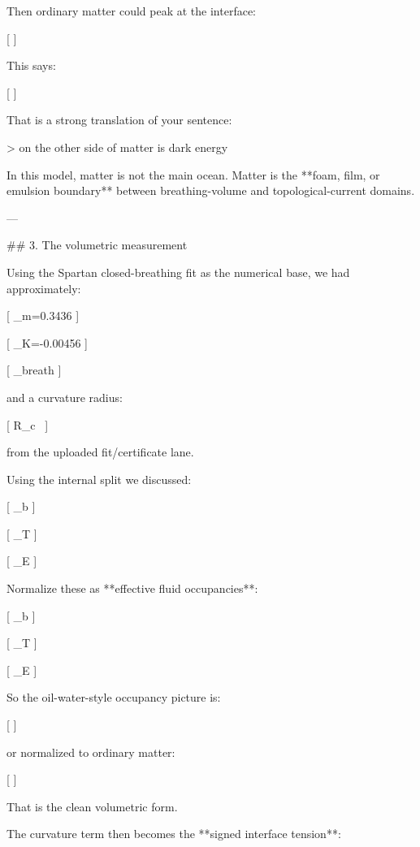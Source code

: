 Then ordinary matter could peak at the interface:

[
]

This says:

[
]

That is a strong translation of your sentence:

> on the other side of matter is dark energy

In this model, matter is not the main ocean. Matter is the **foam, film, or emulsion boundary** between breathing-volume and topological-current domains.

---

## 3. The volumetric measurement

Using the Spartan closed-breathing fit as the numerical base, we had approximately:

[
\Omega_m=0.3436
]

[
\Omega_K=-0.00456
]

[
\Omega_{\rm breath}
]

and a curvature radius:

[
R_c\ 
]

from the uploaded fit/certificate lane. 

Using the internal split we discussed:

[
\Omega_b
]

[
\Omega_T
]

[
\Omega_E
]

Normalize these as **effective fluid occupancies**:

[
\phi_b%
]

[
\phi_T%
]

[
\phi_E%
]

So the oil-water-style occupancy picture is:

[
]

or normalized to ordinary matter:

[
]

That is the clean volumetric form.

The curvature term then becomes the **signed interface tension**:

